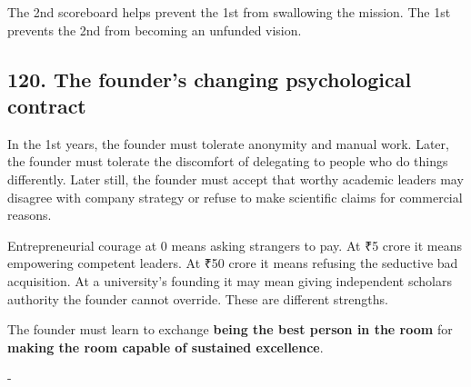 The 2nd scoreboard helps prevent the 1st from swallowing the mission. The 1st prevents the 2nd from becoming an unfunded vision.

\subsection{120. The founder's changing psychological contract}

In the 1st years, the founder must tolerate anonymity and manual work. Later, the founder must tolerate the discomfort of delegating to people who do things differently. Later still, the founder must accept that worthy academic leaders may disagree with company strategy or refuse to make scientific claims for commercial reasons.

Entrepreneurial courage at 0 means asking strangers to pay. At \textnormal{₹}5 crore it means empowering competent leaders. At \textnormal{₹}50 crore it means refusing the seductive bad acquisition. At a university's founding it may mean giving independent scholars authority the founder cannot override. These are different strengths.

The founder must learn to exchange \textbf{being the best person in the room} for \textbf{making the room capable of sustained excellence}.

-


